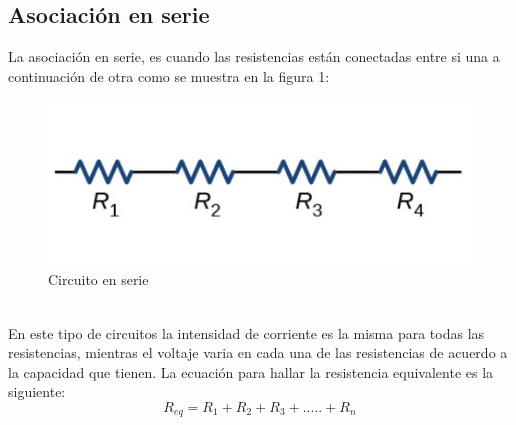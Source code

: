 \subsection{Asociación en serie}
La asociación en serie, es cuando las resistencias están conectadas entre si una a continuación de  otra como se muestra en la figura 1:\\
\begin{figure}[h]
	\centering
	\includegraphics{imagenes/serie}
	\caption{Circuito en serie}
\end{figure}\\
En este tipo de circuitos la intensidad de corriente es la misma para todas las resistencias, mientras el voltaje varia en cada una de las resistencias de acuerdo a la capacidad que tienen. La ecuación para hallar la resistencia equivalente es la siguiente:
\begin{equation*}
	R_{eq}= R_{1} + R_{2}+ R_{3} + .....  + R_{n}
\end{equation*}
